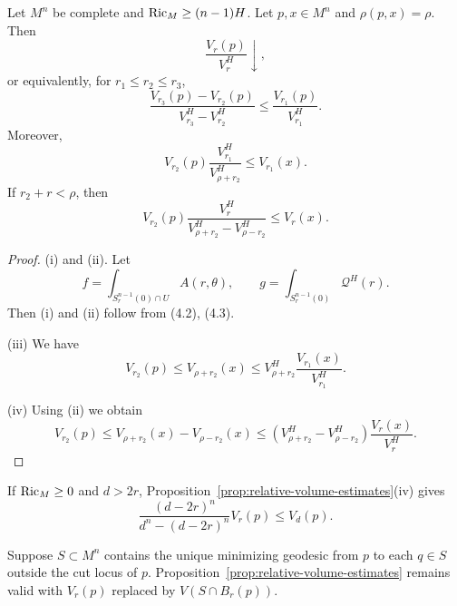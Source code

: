 \begin{proposition}
\label{prop:relative-volume-estimates}

Let $M^n$ be complete and $\operatorname{Ric}_M\geq (n-1)H$. Let $p,x\in M^n$ and
$\rho(p,x)=\rho$. Then
\begin{equation}
\tag{i}
\frac{V_r(p)}{V_r^H}\downarrow,
\end{equation}
or equivalently, for $r_1 \le r_2 \le r_3$,
\begin{equation}
\tag{ii}
\frac{V_{r_3}(p)-V_{r_2}(p)}{V_{r_3}^H-V_{r_2}^H}\le \frac{V_{r_1}(p)}{V_{r_1}^H}.
\end{equation}
Moreover,
\begin{equation}
\tag{iii}
V_{r_2}(p)\frac{V_{r_1}^H}{V_{\rho+r_2}^H}\le V_{r_1}(x).
\end{equation}
If $r_2+r<\rho$, then
\begin{equation}
\tag{iv}
V_{r_2}(p)\frac{V_r^H}{V_{\rho+r_2}^H-V_{\rho-r_2}^H}\le V_r(x).
\end{equation}
\end{proposition}

\begin{proof}
\sketch
(i) and (ii). Let
\begin{equation}
\tag{4.10}
f=\int_{S_r^{n-1}(0)\cap U}A(r,\theta), \qquad g=\int_{S_r^{n-1}(0)}\mathcal{Q}^H(r).
\end{equation}
Then (i) and (ii) follow from (4.2), (4.3).

(iii) We have
\begin{equation}
\tag{4.11}
V_{r_2}(p)\le V_{\rho+r_2}(x)\le V_{\rho+r_2}^H\frac{V_{r_1}(x)}{V_{r_1}^H}.
\end{equation}

(iv) Using (ii) we obtain
\begin{equation}
\tag{4.12}
V_{r_2}(p)\le V_{\rho+r_2}(x)-V_{\rho-r_2}(x)\le \left(V_{\rho+r_2}^H-V_{\rho-r_2}^H\right)\frac{V_r(x)}{V_r^H}.
\end{equation}
\end{proof}

If $\operatorname{Ric}_M\ge 0$ and $d>2r$, Proposition~\ref{prop:relative-volume-estimates}(iv) gives
\begin{equation}
\tag{4.13}
\frac{(d-2r)^n}{d^n-(d-2r)^n}V_r(p)\le V_d(p).
\end{equation}

\begin{remark}
\label{rem:relative-volume-star-shaped}

Suppose $S\subset M^n$ contains the unique minimizing geodesic from $p$ to
each $q\in S$ outside the cut locus of $p$. Proposition~\ref{prop:relative-volume-estimates} remains valid with
$V_r(p)$ replaced by $V(S\cap B_r(p))$.
\end{remark}

